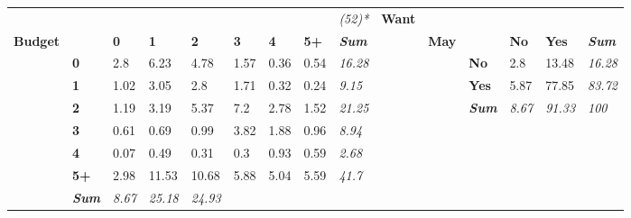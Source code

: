 \begin{table}
{\begin{threeparttable}
\begin{tabular}{lllllllllllllll}
   &
   &
   &
   &
   &
   &
  \textit{} &
   &
  \textit{(52)*} &
  \textbf{Want} &
   &
   &
  \textit{} \\
\textbf{Budget} &
   &
  \textbf{0} &
  \textbf{1} &
  \textbf{2} &
  \textbf{3} &
  \textbf{4} &
  \textbf{5+} &
  \textit{\textbf{Sum}} &
  \textbf{} &
  \textbf{May} &
   &
  \textbf{No} &
  \textbf{Yes} &
  \textit{\textbf{Sum}} \\
 &
  \textbf{0} &
  \cellcolor[HTML]{EAEAEA}2.8 &
  \cellcolor[HTML]{D0D0D0}6.23 &
  \cellcolor[HTML]{DBDBDB}4.78 &
  \cellcolor[HTML]{F4F4F4}1.57 &
  \cellcolor[HTML]{FDFDFD}0.36 &
  \cellcolor[HTML]{FCFCFC}0.54 &
  \textit{16.28} &
   &
   &
  \textbf{No} &
  \cellcolor[HTML]{FFFFFF}2.8 &
  \cellcolor[HTML]{F3F3F3}13.48 &
  \textit{16.28} \\
 &
  \textbf{1} &
  \cellcolor[HTML]{F8F8F8}1.02 &
  \cellcolor[HTML]{E8E8E8}3.05 &
  \cellcolor[HTML]{EAEAEA}2.8 &
  \cellcolor[HTML]{F3F3F3}1.71 &
  \cellcolor[HTML]{FEFEFE}0.32 &
  \cellcolor[HTML]{FEFEFE}0.24 &
  \textit{9.15} &
   &
   &
  \textbf{Yes} &
  \cellcolor[HTML]{FCFCFC}5.87 &
  \cellcolor[HTML]{A6A6A6}77.85 &
  \textit{83.72} \\
 &
  \textbf{2} &
  \cellcolor[HTML]{F7F7F7}1.19 &
  \cellcolor[HTML]{E7E7E7}3.19 &
  \cellcolor[HTML]{D6D6D6}5.37 &
  \cellcolor[HTML]{C8C8C8}7.2 &
  \cellcolor[HTML]{EAEAEA}2.78 &
  \cellcolor[HTML]{F4F4F4}1.52 &
  \textit{21.25} &
   &
   &
  \textit{\textbf{Sum}} &
  \textit{8.67} &
  \textit{91.33} &
  \textit{100} \\
 &
  \textbf{3} &
  \cellcolor[HTML]{FBFBFB}0.61 &
  \cellcolor[HTML]{FBFBFB}0.69 &
  \cellcolor[HTML]{F8F8F8}0.99 &
  \cellcolor[HTML]{E2E2E2}3.82 &
  \cellcolor[HTML]{F1F1F1}1.88 &
  \cellcolor[HTML]{F9F9F9}0.96 &
  \textit{8.94} &
   &
   &
   &
   &
   &
  \textit{} \\
 &
  \textbf{4} &
  \cellcolor[HTML]{FFFFFF}0.07 &
  \cellcolor[HTML]{FCFCFC}0.49 &
  \cellcolor[HTML]{FEFEFE}0.31 &
  \cellcolor[HTML]{FEFEFE}0.3 &
  \cellcolor[HTML]{F9F9F9}0.93 &
  \cellcolor[HTML]{FBFBFB}0.59 &
  \textit{2.68} &
   &
   &
   &
   &
   &
  \textit{} \\
 &
  \textbf{5+} &
  \cellcolor[HTML]{E9E9E9}2.98 &
  \cellcolor[HTML]{A6A6A6}11.53 &
  \cellcolor[HTML]{ADADAD}10.68 &
  \cellcolor[HTML]{D2D2D2}5.88 &
  \cellcolor[HTML]{D9D9D9}5.04 &
  \cellcolor[HTML]{D5D5D5}5.59 &
  \textit{41.7} &
   &
   &
   &
   &
   &
  \textit{} \\
\textit{} &
  \textit{\textbf{Sum}} &
  \textit{8.67} &
  \textit{25.18} &
  \textit{24.93} &

\end{tabular}
\end{threeparttable}}
\end{table}
